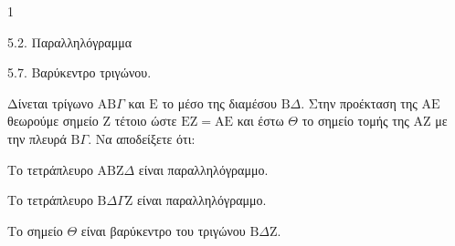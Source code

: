\begin{ylh}{1}
    \item 5.2. Παραλληλόγραμμα
    \item 5.7. Βαρύκεντρο τριγώνου.
\end{ylh}
Δίνεται τρίγωνο $\mathrm{A}\mathrm{B}\Gamma$ και $\mathrm{E}$ το μέσο της διαμέσου $\mathrm{B}\Delta$. Στην προέκταση της $\mathrm{A}\mathrm{E}$ θεωρούμε σημείο $\mathrm{Z}$ τέτοιο ώστε $\mathrm{E}\mathrm{Z} = \mathrm{A}\mathrm{E}$ και έστω $\Theta$ το σημείο τομής της $\mathrm{A}\mathrm{Z}$ με την πλευρά $\mathrm{B}\Gamma$.
Να αποδείξετε ότι:
\begin{alist}
    \item Το τετράπλευρο $\mathrm{A}\mathrm{B}\mathrm{Z}\Delta$ είναι παραλληλόγραμμο. 
    \item Το τετράπλευρο $\mathrm{B}\Delta\Gamma\mathrm{Z}$ είναι παραλληλόγραμμο. 
    \item Το σημείο $\Theta$ είναι βαρύκεντρο του τριγώνου $\mathrm{B}\Delta\mathrm{Z}$. 
\end{alist}
